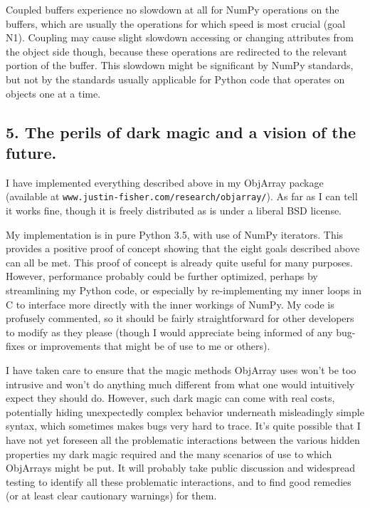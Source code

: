 \documentclass[letterpaper,compsoc,twoside]{IEEEtran}
\begin{document}
Coupled buffers experience no slowdown at all for NumPy operations on the buffers, which are usually the operations for which speed is most crucial (goal N1).  Coupling may cause slight slowdown accessing or changing attributes from the object side though, because these operations are redirected to the relevant portion of the buffer.  This slowdown might be significant by NumPy standards, but not by the standards usually applicable for Python code that operates on objects one at a time.

\subsection{5.  The perils of dark magic and a vision of the future.%
  \label{the-perils-of-dark-magic-and-a-vision-of-the-future}%
}


I have implemented everything described above in my ObjArray package (available at \texttt{www.justin-fisher.com/research/objarray/}).  As far as I can tell it works fine, though it is freely distributed \textquotedbl{}as is\textquotedbl{} under a liberal BSD license.

My implementation is in pure Python 3.5, with use of NumPy iterators.  This provides a positive \textquotedbl{}proof of concept\textquotedbl{} showing that the eight goals described above can all be met.  This proof of concept is already quite useful for many purposes.  However, performance probably could be further optimized, perhaps by streamlining my Python code, or especially by re-implementing my inner loops in C to interface more directly with the inner workings of NumPy.  My code is profusely commented, so it should be fairly straightforward for other developers to modify as they please (though I would appreciate being informed of any bug-fixes or improvements that might be of use to me or others).

I have taken care to ensure that the \textquotedbl{}magic methods\textquotedbl{} ObjArray uses won't be too intrusive and won't do anything much different from what one would intuitively expect they should do.  However, such \textquotedbl{}dark magic\textquotedbl{} can come with real costs, potentially hiding unexpectedly complex behavior underneath misleadingly simple syntax, which sometimes makes bugs very hard to trace.  It's quite possible that I have not yet foreseen all the problematic interactions between the various hidden properties my dark magic required and the many scenarios of use to which ObjArrays might be put.  It will probably take public discussion and widespread testing to identify all these problematic interactions, and to find good remedies (or at least clear cautionary warnings) for them.
\end{document}
